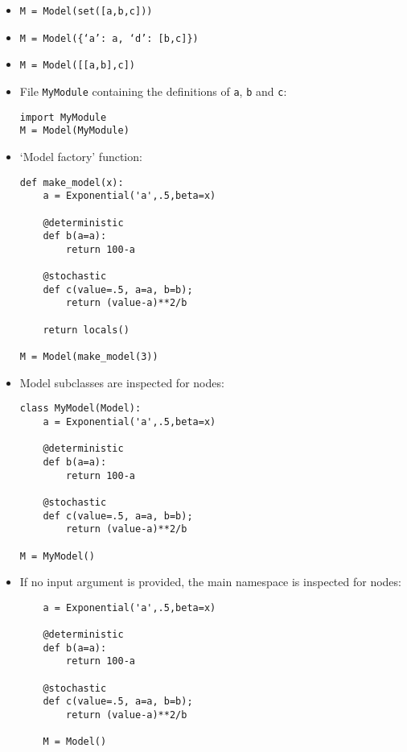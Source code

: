 \begin{itemize}
    \item \texttt{M = Model(set([a,b,c]))}
    \item \texttt{M = Model(\{`a': a, `d': [b,c]\})}
    \item \texttt{M = Model([[a,b],c])}
    \item File \texttt{MyModule} containing the definitions of \texttt{a}, \texttt{b} and \texttt{c}:\begin{verbatim}
import MyModule
M = Model(MyModule)
    \end{verbatim}
    \item `Model factory' function:
    \begin{verbatim}
def make_model(x):
    a = Exponential('a',.5,beta=x)
    
    @deterministic
    def b(a=a):
        return 100-a
    
    @stochastic
    def c(value=.5, a=a, b=b);
        return (value-a)**2/b
        
    return locals()
    
M = Model(make_model(3))
    \end{verbatim}
    \item Model subclasses are inspected for nodes:
    \begin{verbatim}
class MyModel(Model):
    a = Exponential('a',.5,beta=x)

    @deterministic
    def b(a=a):
        return 100-a

    @stochastic
    def c(value=.5, a=a, b=b);
        return (value-a)**2/b        
        
M = MyModel()
    \end{verbatim}    
    \item If no input argument is provided, the main namespace is inspected for nodes:
    \begin{verbatim}
    a = Exponential('a',.5,beta=x)

    @deterministic
    def b(a=a):
        return 100-a

    @stochastic
    def c(value=.5, a=a, b=b);
        return (value-a)**2/b        
    
    M = Model()
    \end{verbatim}

\end{itemize}

\hypertarget{sampler}{}
